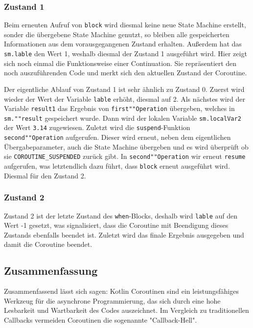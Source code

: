 \documentclass[fontsize=12pt,paper=a4,twoside=semi,parskip=half-,headsepline,headinclude]{scrreprt}
\begin{document}
\subsubsection{Zustand 1}

Beim erneuten Aufruf von \texttt{block} wird diesmal keine neue State Machine erstellt, sonder die übergebene State Machine genutzt, so bleiben alle gespeicherten Informationen aus dem vorausgegangenen Zustand erhalten. Außerdem hat das \texttt{sm.lable} den Wert 1, weshalb diesmal der Zustand 1 ausgeführt wird. Hier zeigt sich noch einmal die Funktionsweise einer Continuation. Sie repräsentiert den noch auszuführenden Code und merkt sich den aktuellen Zustand der Coroutine. 

Der eigentliche Ablauf von Zustand 1 ist sehr ähnlich zu Zustand 0. Zuerst wird wieder der Wert der Variable \texttt{lable} erhöht, diesmal auf 2. Als nächstes wird der Variable \texttt{result1} das Ergebnis von \texttt{first""Operation} übergeben, welches in \texttt{sm.""result} gespeichert wurde. Dann wird der lokalen Variable \texttt{sm.localVar2} der Wert \texttt{3.14} zugewiesen. Zuletzt wird die \texttt{suspend}-Funktion \texttt{second""Operation} aufgerufen. Dieser wird erneut, neben dem eigentlichen Übergabeparameter, auch die State Machine übergeben und es wird überprüft ob sie \texttt{COROUTINE\_SUSPENDED} zurück gibt. In \texttt{second""Operation} wir erneut \texttt{resume} aufgerufen, was letztendlich dazu führt, dass \texttt{block} erneut ausgeführt wird. Diesmal für den Zustand 2.

\subsubsection{Zustand 2}

Zustand 2 ist der letzte Zustand des \texttt{when}-Blocks, deshalb wird \texttt{lable} auf den Wert -1 gesetzt, was signalisiert, dass die Coroutine mit Beendigung dieses Zustands ebenfalls beendet ist. Zuletzt wird das finale Ergebnis ausgegeben und damit die Coroutine beendet.

\subsection{Zusammenfassung}

Zusammenfassend lässt sich sagen: Kotlin Coroutinen sind ein leistungsfähiges Werkzeug für die asynchrone Programmierung, das sich durch eine hohe Lesbarkeit und Wartbarkeit des Codes auszeichnet. Im Vergleich zu traditionellen Callbacks vermeiden Coroutinen die sogenannte "Callback-Hell".
\end{document}
